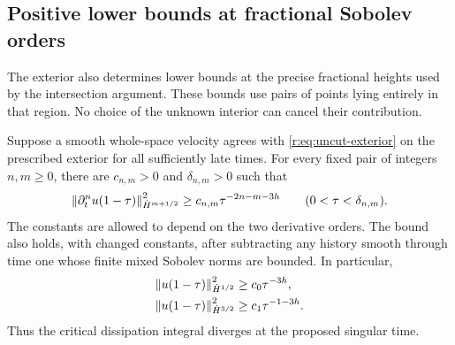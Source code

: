 \subsection{Positive lower bounds at fractional Sobolev orders}

The exterior also determines lower bounds at the precise fractional heights used by the intersection argument. These bounds use pairs of points lying entirely in that region. No choice of the unknown interior can cancel their contribution.

\begin{theorem}\label{r:joined-thm:criticalexterior}
Suppose a smooth whole-space velocity agrees with \eqref{r:eq:uncut-exterior} on the prescribed exterior for all sufficiently late times. For every fixed pair of integers $n,m\ge0$, there are $c_{n,m}>0$ and $\delta_{n,m}>0$ such that
\begin{equation}\label{r:joined-eq:criticalexterior}
\left\lVert \partial_t^n u(1-\tau)\right\rVert_{\dot H^{m+1/2}}^2
\ge c_{n,m}\tau^{-2n-m-3h}
\qquad(0<\tau<\delta_{n,m}).
\end{equation}
The constants are allowed to depend on the two derivative orders. The bound also holds, with changed constants, after subtracting any history smooth through time one whose finite mixed Sobolev norms are bounded. In particular,
\begin{equation}\label{r:joined-eq:criticalexteriorbase}
\begin{aligned}
\left\lVert u(1-\tau)\right\rVert_{\dot H^{1/2}}^2&\ge c_0\tau^{-3h},\\
\left\lVert u(1-\tau)\right\rVert_{\dot H^{3/2}}^2&\ge c_1\tau^{-1-3h}.
\end{aligned}
\end{equation}
Thus the critical dissipation integral diverges at the proposed singular time.
\end{theorem}

